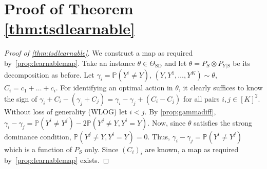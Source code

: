 \documentclass[11pt]{article} %
\newcommand{\SD}{\mathrm{SD}}
\newcommand{\TSD}{\Theta_{\SD}}
\newcommand{\Prob}[1]{\mathbb{P}\left(#1\right)}
\begin{document}
\section*{Proof of  Theorem \ref{thm:tsdlearnable}}
\begin{proof}[Proof of \cref{thm:tsdlearnable}]
	We construct a map as required by~\cref{prop:learnablemap}.
	Take an instance $\theta \in \TSD$ and let $\theta = P_S \otimes P_{Y|S}$ be its decomposition as before.
	Let $\gamma_i = \Prob{Y^i \ne Y}$, $(Y,Y^1,\dots,Y^K)\sim \theta$, $C_i = c_1+\dots+c_i$.
	For identifying an optimal action in $\theta$, it clearly suffices
	to know the sign of $\gamma_i + C_i - (\gamma_j +C_j) = \gamma_i-\gamma_j + (C_i-C_j)$ for all pairs $i,j\in [K]^2$.
	Without loss of generality (WLOG) let $i<j$. By \cref{prop:gammadiff},
	$\gamma_i - \gamma_j = \Prob{ Y^i \ne Y^j } -2 \Prob{ Y^j\ne Y, Y^i = Y }$.
	Now, since $\theta$ satisfies the strong dominance condition, $ \Prob{ Y^j\ne Y, Y^i = Y } = 0$.
	Thus, $\gamma_i - \gamma_j = \Prob{ Y^i \ne Y^j }$
	which is a function of $P_S$ only.
	Since $(C_i)_i$ are known, a map as required by~\cref{prop:learnablemap} exists.
\end{proof}
\end{document}
